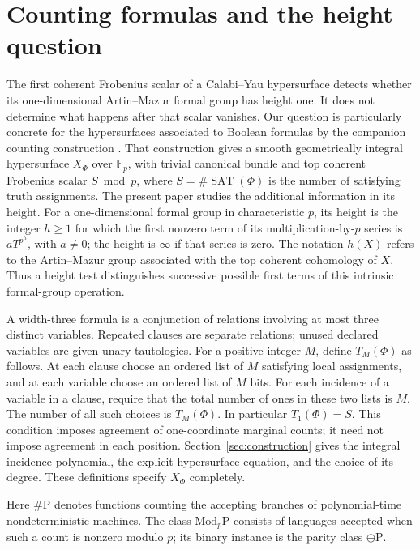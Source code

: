 \documentclass[11pt]{article}
\theoremstyle{definition}
\begin{document}
\section{Counting formulas and the height question}
The first coherent Frobenius scalar of a Calabi--Yau hypersurface detects
whether its one-dimensional Artin--Mazur formal group has height one.
It does not determine what happens after that scalar vanishes.
Our question is particularly concrete for the hypersurfaces associated
to Boolean formulas by the companion counting construction
\citep[Theorems~1.1--1.2, Sections~2--3]{Counting}.
That construction gives a smooth geometrically integral hypersurface
$X_\Phi$ over $\mathbb F_p$, with trivial canonical bundle and top
coherent Frobenius scalar $S\bmod p$, where
$S=\#\operatorname{SAT}(\Phi)$ is the number of satisfying truth assignments.
The present paper studies the
additional information in its height.
For a one-dimensional formal group in characteristic $p$, its height
is the integer $h\ge1$ for which the first nonzero term of its
multiplication-by-$p$ series is $aT^{p^h}$, with $a\ne0$; the height
is $\infty$ if that series is zero. The notation $h(X)$ refers to
the Artin--Mazur group associated with the top coherent cohomology
of $X$. Thus a height test distinguishes successive possible first
terms of this intrinsic formal-group operation.

A width-three formula is a conjunction of relations involving at most
three distinct variables. Repeated clauses are separate relations;
unused declared variables are given unary tautologies.
For a positive integer $M$, define $T_M(\Phi)$ as follows.
At each clause choose an ordered list of $M$ satisfying local
assignments, and at each variable choose an ordered list of $M$ bits.
For each incidence of a variable in a clause, require that the total
number of ones in these two lists is $M$.
The number of all such choices is $T_M(\Phi)$.
In particular $T_1(\Phi)=S$. This condition imposes agreement of
one-coordinate marginal counts; it need not impose agreement in
each position. Section~\ref{sec:construction} gives the integral
incidence polynomial, the explicit hypersurface equation, and the
choice of its degree. These definitions specify $X_\Phi$ completely.

Here $\#\mathrm P$ denotes functions counting the accepting branches of
polynomial-time nondeterministic machines. The class
$\mathrm{Mod}_p\mathrm P$ consists of languages accepted when such a
count is nonzero modulo $p$; its binary instance is the parity class
$\oplus\mathrm P$.
\end{document}
